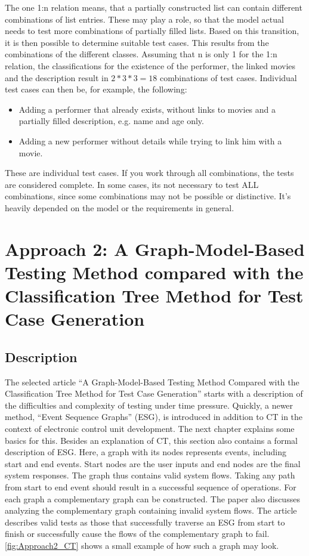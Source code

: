 The one 1:n relation means, that a partially constructed list can contain different combinations of list entries. These may play a role, so that the model actual needs to test more combinations of partially filled lists. Based on this transition, it is then possible to determine suitable test cases. This results from the combinations of the different classes. Assuming that n is only 1 for the 1:n relation, the classifications for the existence of the performer, the linked movies and the description result in $2*3*3 = 18$ combinations of test cases. Individual test cases can then be, for example, the following:

\begin{itemize}
\item Adding a performer that already exists, without links to movies and a partially filled description, e.g. name and age only.
\item Adding a new performer without details while trying to link him with a movie.
\end{itemize}

These are individual test cases. If you work through all combinations, the tests are considered complete. In some cases, its not necessary to test ALL combinations, since some combinations may not be possible or distinctive. It's heavily depended on the model or the requirements in general.

\section{Approach 2: A Graph-Model-Based Testing Method compared with the Classification Tree Method for Test Case Generation}
\label{Kap:Approach2}

\subsection{Description}

The selected article \enquote{A Graph-Model-Based Testing Method Compared with the Classification Tree Method for Test Case Generation} starts with a description of the difficulties and complexity of testing under time pressure. Quickly, a newer method, \enquote{Event Sequence Graphs} (ESG), is introduced in addition to CT in the context of electronic control unit development. The next chapter explains some basics for this. Besides an explanation of CT, this section also contains a formal description of ESG. Here, a graph with its nodes represents events, including start and end events. Start nodes are the user inputs and end nodes are the final system responses. The graph thus contains valid system flows. Taking any path from start to end event should result in a successful sequence of operations. For each graph a complementary graph can be constructed. The paper also discusses analyzing the complementary graph containing invalid system flows. The article describes valid tests as those that successfully traverse an ESG from start to finish or successfully cause the flows of the complementary graph to fail. \autoref{fig:Approach2_CT} shows a small example of how such a graph may look.

